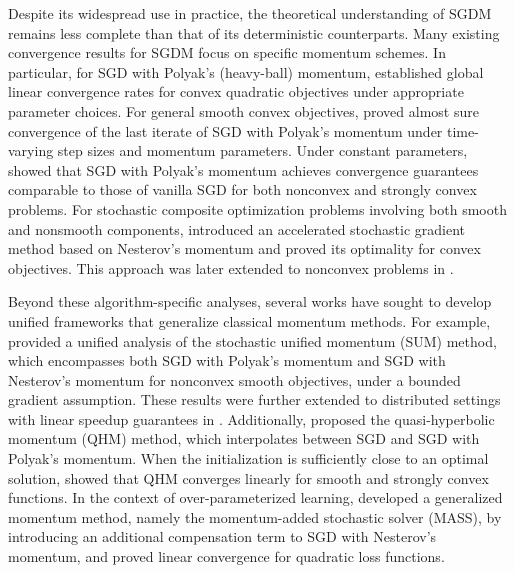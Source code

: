 \documentclass[10pt]{article}
\numberwithin{equation}{section}
\theoremstyle{definition}
\begin{document}
Despite its widespread use in practice, the theoretical understanding of SGDM remains less complete than that of its deterministic counterparts. Many existing convergence results for SGDM focus on specific momentum schemes.
In particular, for SGD with Polyak’s (heavy-ball) momentum, \citet{loizou2020momentum} established global linear convergence rates for convex quadratic objectives under appropriate parameter choices. For general smooth convex objectives, \citet{sebbouh2021almost} proved almost sure convergence of the last iterate of SGD with Polyak’s momentum under time-varying step sizes and momentum parameters. Under constant parameters, \citet{liu2020improved} showed that SGD with Polyak’s momentum achieves convergence guarantees comparable to those of vanilla SGD for both nonconvex and strongly convex problems.
For stochastic composite optimization problems involving both smooth and nonsmooth components, \citet{lan2012optimal} introduced an accelerated stochastic gradient method based on Nesterov’s momentum and proved its optimality for convex objectives. This approach was later extended to nonconvex problems in \citet{ghadimi2016accelerated}.

Beyond these algorithm-specific analyses, several works have sought to develop unified frameworks that generalize classical momentum methods. For example, \citet{yan2018unified,yang2016unified} provided a unified analysis of the stochastic unified momentum (SUM) method, which encompasses both SGD with Polyak’s momentum and SGD with Nesterov’s momentum for nonconvex smooth objectives, under a bounded gradient assumption. These results were further extended to distributed settings with linear speedup guarantees in \citet{yu2019linear}. 
Additionally, \citet{ma2018quasi} proposed the quasi-hyperbolic momentum (QHM) method, which interpolates between SGD and SGD with Polyak’s momentum. When the initialization is sufficiently close to an optimal solution, \citet{gitman2019understanding} showed that QHM converges linearly for smooth and strongly convex functions. In the context of over-parameterized learning, \citet{liu2018accelerating} developed a generalized momentum method, namely the momentum-added stochastic solver (MASS), by introducing an additional compensation term to SGD with Nesterov’s momentum, and proved linear convergence for quadratic loss functions.
\end{document}
